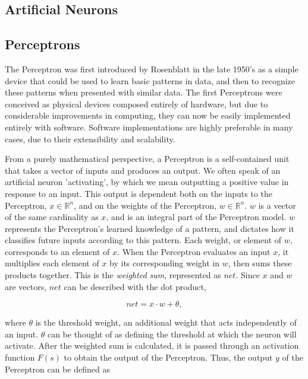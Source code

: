 \documentclass[a4paper, 11pt]{article} %
\begin{document}
\subsection*{Artificial Neurons}



\subsection*{Perceptrons}

The Perceptron was first introduced by Rosenblatt in the late 1950's \cite{rosenblatt} as a simple device that could be used to learn basic patterns in data, and then to recognize these patterns when presented with similar data.  The first Perceptrons were conceived as physical devices composed entirely of hardware, but due to considerable improvements in computing, they can now be easily implemented entirely with software.  Software implementations are highly preferable in many cases, due to their extensibility and scalability.

From a purely mathematical perspective, a Perceptron is a self-contained unit that takes a vector of inputs and produces an output.  We often speak of an artificial neuron 'activating', by which we mean outputting a positive value in response to an input.  This output is dependent both on the inputs to the Perceptron, $x\in\mathbb{R}^n$, and on the weights of the Perceptron, $w\in\mathbb{R}^n$.  $w$ is a vector of the same cardinality as $x$, and is an integral part of the Perceptron model.  $w$ represents the Perceptron's learned knowledge of a pattern, and dictates how it classifies future inputs according to this pattern.  Each weight, or element of $w$, corresponds to an element of $x$.  When the Perceptron evaluates an input $x$, it multiplies each element of $x$ by its corresponding weight in $w$, then sums these products together.  This is the \textit{weighted sum}, represented as $net$.  Since $x$ and $w$ are vectors, $net$ can be described with the dot product,

\begin{equation}
net = x \cdot w + \theta ,
\end{equation}

where $\theta$ is the threshold weight, an additional weight that acts independently of an input.  $\theta$ can be thought of as defining the threshold at which the neuron will activate.  After the weighted sum is calculated, it is passed through an activation function $F(s)$ to obtain the output of the Perceptron.  Thus, the output $y$ of the Perceptron can be defined as
\end{document}
